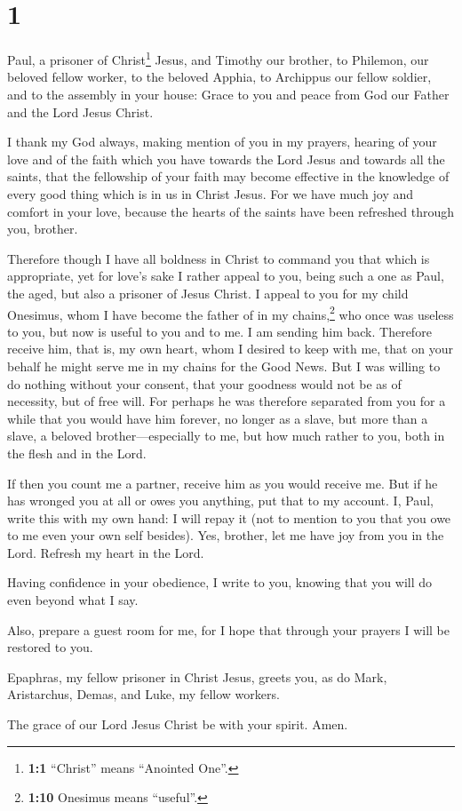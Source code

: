 \hypertarget{section}{%
\section{1}\label{section}}

 Paul, a prisoner of Christ\footnote{\textbf{1:1}
  ``Christ'' means ``Anointed One''.} Jesus, and Timothy our brother, to
Philemon, our beloved fellow worker,  to the beloved
Apphia, to Archippus our fellow soldier, and to the assembly in your
house:  Grace to you and peace from God our Father and the
Lord Jesus Christ.

 I thank my God always, making mention of you in my
prayers,  hearing of your love and of the faith which you
have towards the Lord Jesus and towards all the saints, 
that the fellowship of your faith may become effective in the knowledge
of every good thing which is in us in Christ Jesus.  For
we have much joy and comfort in your love, because the hearts of the
saints have been refreshed through you, brother.

 Therefore though I have all boldness in Christ to command
you that which is appropriate,  yet for love's sake I
rather appeal to you, being such a one as Paul, the aged, but also a
prisoner of Jesus Christ.  I appeal to you for my child
Onesimus, whom I have become the father of in my chains,\footnote{\textbf{1:10}
  Onesimus means ``useful''.}  who once was useless to
you, but now is useful to you and to me.  I am sending
him back. Therefore receive him, that is, my own heart, 
whom I desired to keep with me, that on your behalf he might serve me in
my chains for the Good News.  But I was willing to do
nothing without your consent, that your goodness would not be as of
necessity, but of free will.  For perhaps he was
therefore separated from you for a while that you would have him
forever,  no longer as a slave, but more than a slave, a
beloved brother---especially to me, but how much rather to you, both in
the flesh and in the Lord.

 If then you count me a partner, receive him as you would
receive me.  But if he has wronged you at all or owes you
anything, put that to my account.  I, Paul, write this
with my own hand: I will repay it (not to mention to you that you owe to
me even your own self besides).  Yes, brother, let me
have joy from you in the Lord. Refresh my heart in the Lord.

 Having confidence in your obedience, I write to you,
knowing that you will do even beyond what I say.

 Also, prepare a guest room for me, for I hope that
through your prayers I will be restored to you.

 Epaphras, my fellow prisoner in Christ Jesus, greets
you,  as do Mark, Aristarchus, Demas, and Luke, my fellow
workers.

 The grace of our Lord Jesus Christ be with your spirit.
Amen.
